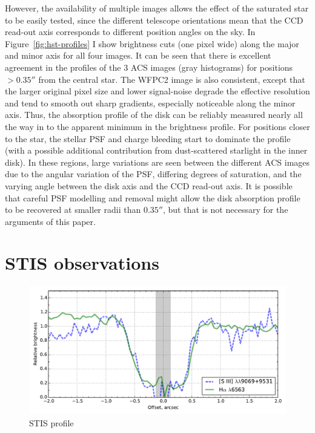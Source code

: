\documentclass[oneside, 11pt]{article}
\begin{document}
However, the availability of multiple images allows the effect of the saturated star to be easily tested, since the different telescope orientations mean that the CCD read-out axis corresponds to different position angles on the sky.   In Figure~\ref{fig:hst-profiles} I show brightness cuts (one pixel wide) along the major and minor axis for all four images.   It can be seen that there is excellent agreement in the profiles of the 3 ACS images (gray histograms) for positions \(> 0.35''\) from the central star.   The WFPC2 image is also consistent, except that the larger original pixel size and lower signal-noise degrade the effective resolution and tend to smooth out sharp gradients, especially noticeable along the minor axis.    Thus, the absorption profile of the disk can be reliably measured nearly all the way in to the apparent minimum in the brightness profile.   For positions closer to the star, the stellar PSF and charge bleeding start to dominate the profile (with a possible additional contribution from dust-scattered starlight in the inner disk).  In these regions, large variations are seen between the different ACS images due to the angular variation of the PSF, differing degrees of saturation, and the varying angle between the disk axis and the CCD read-out axis.   It is possible that careful PSF modelling and removal might allow the disk absorption profile to be recovered at smaller radii than \(0.35''\), but that is not necessary for the arguments of this paper.  

\section{STIS observations}
\label{sec:stis}
\begin{figure}
  \centering
  \includegraphics[width=\linewidth]{stis-218-354-compare}
  \caption{STIS profile}
  \label{fig:stis-profile}
\end{figure}
\end{document}
